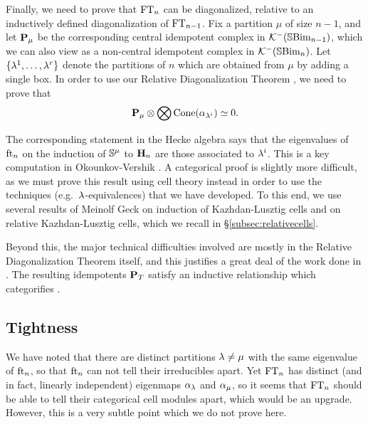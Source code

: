 Finally, we need to prove that $\operatorname{FT}_n$ can be diagonalized, relative to an inductively defined diagonalization of $\operatorname{FT}_{n-1}$. Fix a partition $\mu$ of size $n-1$, and let ${\mathbf P}_\mu$ be the corresponding central idempotent complex in ${\mathcal{K}}^-({\mathbb{S}}{\rm Bim }_{n-1})$, which we can also view as a non-central idempotent complex in ${\mathcal{K}}^-({\mathbb{S}}{\rm Bim }_n)$. Let $\{\lambda^1, \ldots, \lambda^r\}$ denote the partitions of $n$ which are obtained from $\mu$ by adding a single box. In order to use our Relative Diagonalization Theorem \cite[Theorem 8.2]{ElHog17a}, we need to prove that
\begin{equation}\label{eq:relBigOTintro} {\mathbf P}_\mu \otimes \bigotimes \operatorname{Cone}(\alpha_{\lambda^i}) \simeq 0. \end{equation}


The corresponding statement in the Hecke algebra says that the eigenvalues of $\operatorname{ft}_n$ on the induction of ${\mathbb{S}}^\mu$ to ${\mathbf H}_n$ are those associated to $\lambda^i$. This is a key computation in Okounkov-Vershik \cite{OV96}. A categorical proof is slightly more difficult, as we must prove this result using cell theory instead in order to use the techniques (e.g.~$\lambda$-equivalences) that we have developed. To this end, we use several results of Meinolf Geck \cite{GeckInduction,GeckRelative} on induction of Kazhdan-Lusztig cells and on relative Kazhdan-Lusztig cells, which we recall in \S\ref{subsec:relativecells}.

Beyond this, the major technical difficulties involved are mostly in the Relative Diagonalization Theorem itself, and this justifies a great deal of the work done in \cite{ElHog17a}.  The resulting idempotents ${\mathbf P}_T$ satisfy an inductive relationship which categorifies \cite[Equation (11)]{IMO}.

\subsection{Tightness}

We have noted that there are distinct partitions $\lambda \ne \mu$ with the same eigenvalue of $\operatorname{ft}_n$, so that $\operatorname{ft}_n$ can not tell their irreducibles apart. Yet $\operatorname{FT}_n$ has distinct (and in fact, linearly independent) eigenmaps $\alpha_\lambda$ and $\alpha_\mu$, so it seems that $\operatorname{FT}_n$ should be able to tell their categorical cell modules apart, which would be an upgrade. However, this is a very subtle point which we do not prove here.

